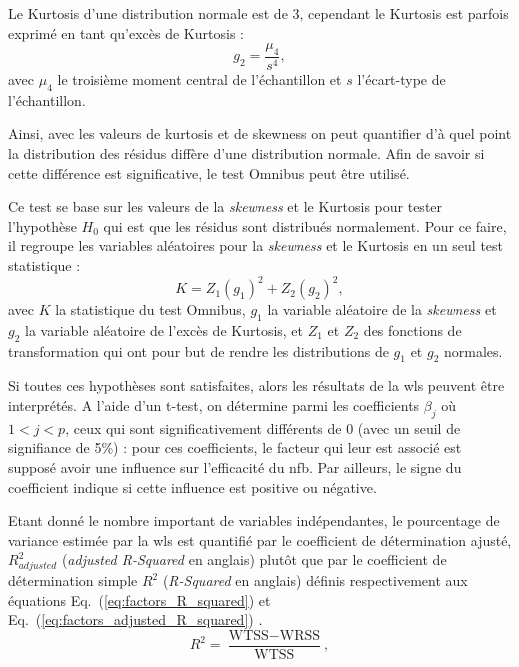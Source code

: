 Le Kurtosis d'une distribution normale est de 3, cependant le Kurtosis est parfois exprimé en tant qu'excès de Kurtosis :
\begin{equation}
\label{eq:factors_kurtosis_excess}
g_{2} = \frac{ \mu_{4} } {s^4}, 
\end{equation}
avec $\mu_{4}$ le troisième moment central de l'échantillon et $s$ l'écart-type de l'échantillon.

Ainsi, avec les valeurs de kurtosis et de skewness on peut quantifier d'à quel point la distribution des résidus diffère 
d'une distribution normale. Afin de savoir si cette différence est significative, le test Omnibus peut être utilisé. 

Ce test se base sur les valeurs de la \textit{skewness} et le Kurtosis pour tester l'hypothèse $H_{0}$ qui est que les résidus sont distribués normalement.
Pour ce faire, il regroupe les variables aléatoires pour la \textit{skewness} et le Kurtosis en un seul test statistique :
\begin{equation}
\label{eq:factors_omnibus_statistic}
K = Z_{1}(g_{1})^2 + Z_{2}(g_{2})^2, 
\end{equation}
avec $K$ la statistique du test Omnibus, $g_{1}$ la variable aléatoire de la \textit{skewness} et
$g_{2}$ la variable aléatoire de l'excès de Kurtosis, et $Z_{1}$ et $Z_{2}$ des fonctions de transformation qui ont pour but de rendre 
les distributions de $g_{1}$ et $g_{2}$ normales.

Si toutes ces hypothèses sont satisfaites, alors les résultats de la \gls{wls} peuvent être interprétés. A l'aide d'un t-test, on détermine  
parmi les coefficients $\beta_{j}$ où $1<j<p$, ceux qui sont significativement différents de 0 (avec un seuil de signifiance de 5\%) : 
pour ces coefficients, le facteur qui leur est associé est supposé avoir une influence sur l'efficacité du \gls{nfb}. Par ailleurs, 
le signe du coefficient indique si cette influence est positive ou négative. 

Etant donné le nombre important de variables indépendantes, le pourcentage de variance estimée par la \gls{wls} est quantifié par le coefficient de 
détermination ajusté, $R^2_{adjusted}$ (\textit{adjusted R-Squared} en anglais) plutôt que par le coefficient de détermination simple $R^2$ (\textit{R-Squared} en anglais)
définis respectivement aux équations Eq.~(\ref{eq:factors_R_squared}) et Eq.~(\ref{eq:factors_adjusted_R_squared}) \citep{James2013}.
\begin{equation}
\label{eq:factors_R_squared}
R^2 = \frac{ \text{WTSS} - \text{WRSS} }{ \text{WTSS} }, 
\end{equation}

